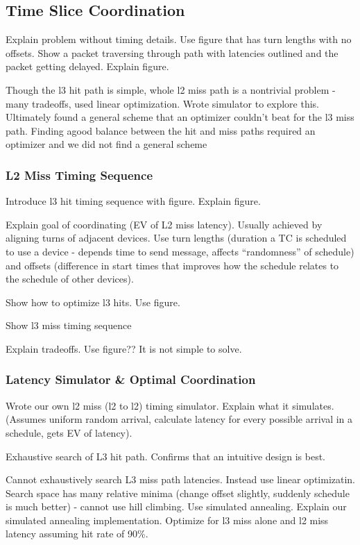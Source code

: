 \subsection{Time Slice Coordination}
\label{sec:coordination}

Explain problem without timing details. Use figure that has turn lengths with 
no offsets. Show a packet traversing through path with latencies outlined and 
the packet getting delayed. Explain figure.

Though the l3 hit path is simple, whole l2 miss 
path is a nontrivial problem - many tradeoffs, used linear 
optimization. Wrote simulator to explore this. Ultimately found a general scheme
that an optimizer couldn't beat for the l3 miss path. Finding agood balance between
the hit and miss paths required an optimizer and we did not find a general scheme

\subsubsection{L2 Miss Timing Sequence}
Introduce l3 hit timing sequence with figure. Explain figure.

Explain goal of coordinating (EV of L2 miss latency). Usually achieved by 
aligning turns of adjacent devices. Use turn lengths (duration a TC is 
scheduled to use a device - depends time to send message, affects 
``randomness'' of schedule) and offsets (difference in start times that
improves how the schedule relates to the schedule of other devices).

Show how to optimize l3 hits. Use figure.

Show l3 miss timing sequence

Explain tradeoffs. Use figure?? It is not simple to solve.

\subsubsection{Latency Simulator \& Optimal Coordination}
Wrote our own l2 miss (l2 to l2) timing simulator. Explain what it simulates. (Assumes 
uniform random arrival, calculate latency for every possible arrival in a 
schedule, gets EV of latency).

Exhaustive search of L3 hit path. Confirms that an intuitive design is best.

Cannot exhaustively search L3 miss path latencies. Instead use linear 
optimizatin. Search space has many relative minima (change offset slightly, 
suddenly schedule is much better) - cannot use hill climbing. Use simulated 
annealing. Explain our simulated annealing implementation. Optimize for l3 miss 
alone and l2 miss latency assuming hit rate of 90\%.

